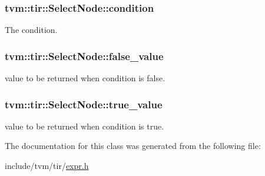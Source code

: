 \subsubsection[{\texorpdfstring{condition}{condition}}]{ tvm\+::tir\+::\+Select\+Node\+::condition}\hypertarget{classtvm_1_1tir_1_1SelectNode_a1f737b98d39e78cb59d10ce6db585d20}{}\label{classtvm_1_1tir_1_1SelectNode_a1f737b98d39e78cb59d10ce6db585d20}


The condition. 

\subsubsection[{\texorpdfstring{false\+\_\+value}{false_value}}]{ tvm\+::tir\+::\+Select\+Node\+::false\+\_\+value}\hypertarget{classtvm_1_1tir_1_1SelectNode_ac1b3f0f013b6a41a483c6d81397a6dac}{}\label{classtvm_1_1tir_1_1SelectNode_ac1b3f0f013b6a41a483c6d81397a6dac}


value to be returned when condition is false. 

\subsubsection[{\texorpdfstring{true\+\_\+value}{true_value}}]{ tvm\+::tir\+::\+Select\+Node\+::true\+\_\+value}\hypertarget{classtvm_1_1tir_1_1SelectNode_a35e913f542bd1231b92adfc2d58938ef}{}\label{classtvm_1_1tir_1_1SelectNode_a35e913f542bd1231b92adfc2d58938ef}


value to be returned when condition is true. 



The documentation for this class was generated from the following file\+:\begin{DoxyCompactItemize}
\item 
include/tvm/tir/\hyperlink{tir_2expr_8h}{expr.\+h}\end{DoxyCompactItemize}
